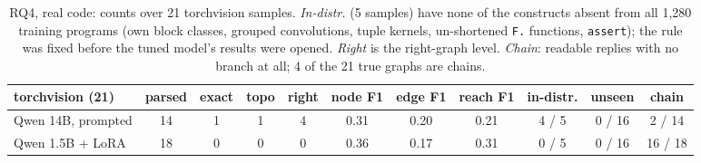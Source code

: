 \begin{table}[!h]
\centering
\small
\begin{tabular}{lcccccccccc}
\hline
torchvision (21) & parsed & exact & topo & right & node F1 & edge F1 & reach F1 & in-distr. & unseen & chain \\
\hline
Qwen 14B, prompted & 14 & 1 & 1 & 4 & 0.31 & 0.20 & 0.21 & 4 / 5 & 0 / 16 & 2 / 14 \\
Qwen 1.5B + LoRA & 18 & 0 & 0 & 0 & 0.36 & 0.17 & 0.31 & 0 / 5 & 0 / 16 & 16 / 18 \\
\hline
\end{tabular}
\caption{RQ4, real code: counts over 21 torchvision samples. \emph{In-distr.} (5 samples) have none of the constructs absent from all 1,280 training programs (own block classes, grouped convolutions, tuple kernels, un-shortened \texttt{F.} functions, \texttt{assert}); the rule was fixed before the tuned model's results were opened. \emph{Right} is the right-graph level. \emph{Chain}: readable replies with no branch at all; 4 of the 21 true graphs are chains.}\label{tab:closing_rq4}
\end{table}
